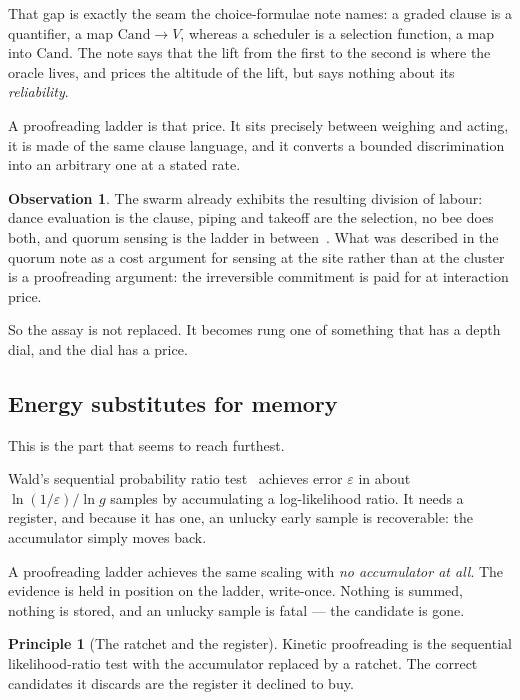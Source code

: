 \documentclass[11pt]{article}
\theoremstyle{plain}
\theoremstyle{definition}
\newtheorem{observation}[theorem]{Observation}
\newtheorem{principle}[theorem]{Principle}
\theoremstyle{remark}
\begin{document}
That gap is exactly the seam the choice-formulae note names: a graded clause
is a quantifier, a map $\mathrm{Cand} \to V$, whereas a scheduler is a
selection function, a map into $\mathrm{Cand}$. The note says that the lift
from the first to the second is where the oracle lives, and prices the
altitude of the lift, but says nothing about its \emph{reliability}.

A proofreading ladder is that price. It sits precisely between weighing and
acting, it is made of the same clause language, and it converts a bounded
discrimination into an arbitrary one at a stated rate.

\begin{observation}
The swarm already exhibits the resulting division of labour: dance evaluation
is the clause, piping and takeoff are the selection, no bee does both, and
quorum sensing is the ladder in between~\cite{Seeley2010}. What was described
in the quorum note as a cost argument for sensing at the site rather than at
the cluster is a proofreading argument: the irreversible commitment is paid
for at interaction price.
\end{observation}

So the assay is not replaced. It becomes rung one of something that has a
depth dial, and the dial has a price.

\subsection{Energy substitutes for memory}

This is the part that seems to reach furthest.

Wald's sequential probability ratio test~\cite{Wald1945} achieves error
$\varepsilon$ in about $\ln(1/\varepsilon)/\ln g$ samples by accumulating a
log-likelihood ratio. It needs a register, and because it has one, an unlucky
early sample is recoverable: the accumulator simply moves back.

A proofreading ladder achieves the same scaling with \emph{no accumulator at
all}. The evidence is held in position on the ladder, write-once. Nothing is
summed, nothing is stored, and an unlucky sample is fatal --- the candidate is
gone.

\begin{principle}[The ratchet and the register]
Kinetic proofreading is the sequential likelihood-ratio test with the
accumulator replaced by a ratchet. The correct candidates it discards are the
register it declined to buy.
\end{principle}
\end{document}
